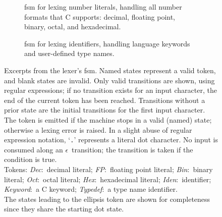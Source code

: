 \documentclass[00-main.tex]{subfiles}
\begin{document}
\begin{figure}[p]
  \hspace{2ex}
  \begin{subfigure}[t]{\textwidth-4ex}
    \centering
    \caption{\Gls{fsm} for lexing number literals, handling all number formats that C supports: decimal, floating point, binary, octal, and hexadecimal.}%
    \label{subfig:lexer fsm numbers}
  \end{subfigure}
  \par\vspace{2\bigskipamount}
  \begin{subfigure}[t]{\textwidth}
    \centering
    \caption{\Gls{fsm} for lexing identifiers, handling language keywords and user-defined type names.}%
    \label{subfig:lexer fsm identifiers}
  \end{subfigure}
  \caption{
    \protect{}Excerpts from the lexer's \gls{fsm}.
    Named states represent a valid token, and blank states are invalid.
    Only valid transitions are shown, using regular expressions; if no transition exists for an input character, the end of the current token has been reached.
    Transitions without a prior state are the initial transitions for the first input character.
    The token is emitted if the machine stops in a valid (named) state; otherwise a lexing error is raised.
    In a slight abuse of regular expression notation, `\texttt{.}' represents a literal dot character.
    No input is consumed along an $\epsilon$~transition; the transition is taken if the condition is true. \\
    Tokens: \emph{Dec}:~decimal literal; \emph{FP}:~floating point literal; \emph{Bin}:~binary literal; \emph{Oct}:~octal literal; \emph{Hex}:~hexadecimal literal; \emph{Iden}:~identifier; \emph{Keyword}:~a C keyword; \emph{Typedef}\!:~a type name identifier. \\
    The states leading to the ellipsis token are shown for completeness since they share the starting dot state.
  }%
  \label{fig:lexer fsm}
\end{figure}
\end{document}
